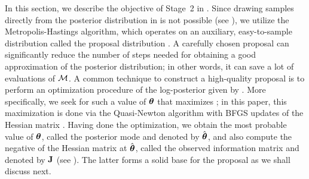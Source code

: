 In this section, we describe the objective of Stage~2 in .
Since drawing samples directly from the posterior distribution in  is not possible (see ), we utilize the Metropolis-Hastings algorithm, which operates on an auxiliary, easy-to-sample distribution called the proposal distribution \cite{gelman2004}.
A carefully chosen proposal can significantly reduce the number of steps needed for obtaining a good approximation of the posterior distribution; in other words, it can save a lot of evaluations of $\model$.
A common technique to construct a high-quality proposal is to perform an optimization procedure of the log-posterior given by .
More specifically, we seek for such a value of ${\boldsymbol\theta}$ that maximizes ; in this paper, this maximization is done via the Quasi-Newton algorithm with BFGS updates of the Hessian matrix \cite{press2007}.
Having done the optimization, we obtain the most probable value of ${\boldsymbol\theta}$, called the posterior mode and denoted by $\hat{{\boldsymbol\theta}}$, and also compute the negative of the Hessian matrix at $\hat{{\boldsymbol\theta}}$, called the observed information matrix and denoted by $\mathbf{J}$ (see ).
The latter forms a solid base for the proposal as we shall discuss next.
